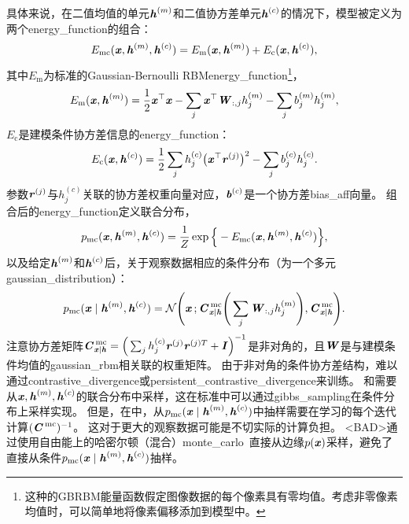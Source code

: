 具体来说，在二值均值的单元$\Vh^{(m)}$和二值协方差单元$\Vh^{(c)}$的情况下，模型被定义为
两个\gls{energy_function}的组合：
\begin{align}
 E_{\text{mc}}(\Vx, \Vh^{(m)}, \Vh^{(c)}) = E_{\text{m}}(\Vx, \Vh^{(m)}) + E_{\text{c}}(\Vx, \Vh^{(c)}),
\end{align}
其中$E_{\text{m}}$为标准的Gaussian-Bernoulli RBM\gls{energy_function}\footnote{这种的\gls{GBRBM}能量函数假定图像数据的每个像素具有零均值。考虑非零像素均值时，可以简单地将像素偏移添加到模型中。}，
\begin{align} \label{eq:2044e}
E_{\text{m}}(\Vx, \Vh^{(m)}) = \frac{1}{2}\Vx^\top \Vx - \sum_j \Vx^\top \MW_{:,j} h_j^{(m)} - \sum_j 
 b_j^{(m)} h_j^{(m)},
\end{align}
$E_{\text{c}}$是建模条件协方差信息的\gls{energy_function}：
\begin{align}
 E_{\text{c}}(\Vx, \Vh^{(c)}) = \frac{1}{2} \sum_j h_j^{(c)} \big( \Vx^\top \Vr^{(j)}\big)^2 - \sum_j 
 b_j^{(c)} h_j^{(c)}.
\end{align}
参数$\Vr^{(j)}$与$h_j^{(c)}$关联的协方差权重向量对应，$\Vb^{(c)}$是一个协方差\gls{bias_aff}向量。
组合后的\gls{energy_function}定义联合分布，
\begin{align}
 p_{\text{mc}}(\Vx, \Vh^{(m)}, \Vh^{(c)}) = \frac{1}{Z} \exp \Big\{ -E_{\text{mc}}(\Vx, \Vh^{(m)}, 
 \Vh^{(c)}) \Big\},
\end{align}
以及给定$\Vh^{(m)}$和$\Vh^{(c)}$后，关于观察数据相应的条件分布（为一个多元\gls{gaussian_distribution}）：
\begin{align}
 p_{\text{mc}}(\Vx \mid \Vh^{(m)}, \Vh^{(c)})  = \CalN \Bigg( \Vx \,; \MC_{\Vx \mid \Vh}^{\,\text{mc}} \Bigg(
\sum_j \MW_{:,j}h_j^{(m)} \Bigg), \MC_{\Vx \mid \Vh}^{\,\text{mc}}
 \Bigg).
\end{align}
注意协方差矩阵$\MC_{\Vx \mid \Vh}^{\,\text{mc}} = \Big( \sum_j h_j^{(c)} \Vr^{(j)} \Vr^{(j)T} + \MI
\Big)^{-1}$是非对角的，且$\MW$是与建模条件均值的\gls{gaussian_rbm}相关联的权重矩阵。
由于非对角的条件协方差结构，难以通过\gls{contrastive_divergence}或\gls{persistent_contrastive_divergence}来训练。
和需要从$\Vx,\Vh^{(m)},\Vh^{(c)}$的联合分布中采样，这在标准中可以通过\gls{gibbs_sampling}在条件分布上采样实现。
但是，在中，从$ p_{\text{mc}}(\Vx  \mid \Vh^{(m)}, \Vh^{(c)}) $中抽样需要在学习的每个迭代计算$(\MC^{\,\text{mc}})^{-1}$。
这对于更大的观察数据可能是不切实际的计算负担。
 <BAD>\citet{Ranzato2010b-short}通过使用自由能上的哈密尔顿（混合）\gls{monte_carlo}~\citep{Neal93b}直接从边缘$p(\Vx)$采样，避免了直接从条件$  p_{\text{mc}}(\Vx  \mid \Vh^{(m)}, \Vh^{(c)}) $抽样。


